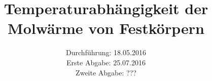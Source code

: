 

\subject{Versuch 47}
\title{Temperaturabhängigkeit der Molwärme von Festkörpern}
\date{Durchführung: 18.05.2016 \\
      Erste Abgabe: 25.07.2016 \\
      Zweite Abgabe: ???}



\maketitle
\newpage







\printbibliography


